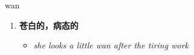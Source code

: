 
\begin{frame}
{\huge wan}
\begin{center}
\begin{enumerate}\Large
  \item \textbf{苍白的，病态的}
  \begin{itemize}
    \item \em{\Large{she looks a little wan after the tiring work}}
  \end{itemize}
\end{enumerate}
\end{center}
\end{frame}
